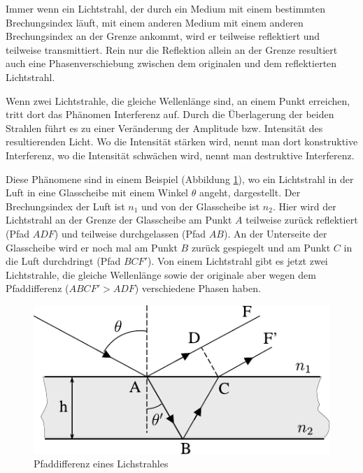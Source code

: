Immer wenn ein Lichtstrahl, der durch ein Medium mit einem bestimmten Brechungsindex läuft, mit einem anderen Medium mit einem anderen Brechungsindex an der Grenze ankommt, wird er teilweise reflektiert und teilweise transmittiert.
Rein nur die Reflektion allein an der Grenze resultiert auch eine Phasenverschiebung zwischen dem originalen und dem reflektierten Lichtstrahl.

Wenn zwei Lichtstrahle, die gleiche Wellenlänge sind, an einem Punkt erreichen, tritt dort das Phänomen Interferenz auf.
Durch die Überlagerung der beiden Strahlen führt es zu einer Veränderung der Amplitude bzw. Intensität des resultierenden Licht.
Wo die Intensität stärken wird, nennt man dort konstruktive Interferenz, wo die Intensität schwächen wird, nennt man destruktive Interferenz.

Diese Phänomene sind in einem Beispiel (Abbildung \ref{fig:pfadabweichung_des_lichtstrahls}), wo ein Lichtstrahl in der Luft in eine Glasscheibe mit einem Winkel $\theta$ angeht, dargestellt.
Der Brechungsindex der Luft ist $n_1$ und von der Glasscheibe ist $n_2$.
Hier wird der Lichtstrahl an der Grenze der Glasscheibe am Punkt $A$ teilweise zurück reflektiert (Pfad $ADF$) und teilweise durchgelassen (Pfad $AB$).
An der Unterseite der Glasscheibe wird er noch mal am Punkt $B$ zurück gespiegelt und am Punkt $C$ in die Luft durchdringt (Pfad $BCF'$).
Von einem Lichtstrahl gibt es jetzt zwei Lichtstrahle, die gleiche Wellenlänge sowie der originale aber wegen dem Pfaddifferenz ($ABCF' > ADF$) verschiedene Phasen haben.
\begin{figure}[htb]
    \centering
    \includegraphics[]{./images/licht_interferenz_furtuna.pdf}
    \caption{Pfaddifferenz eines Lichstrahles \cite{furtuna_2011}}
    \label{fig:pfadabweichung_des_lichtstrahls}
\end{figure}
%

